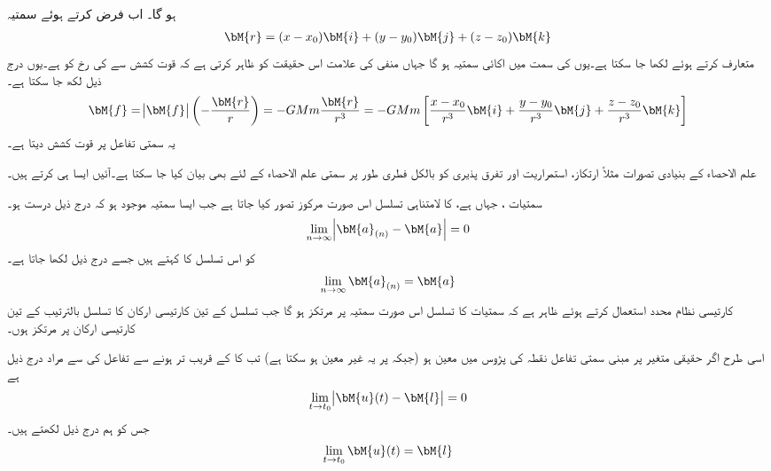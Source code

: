 ہو گا۔ اب  فرض کرتے ہوئے سمتیہ 
\begin{align}
\bM{r}=(x-x_0)\bM{i}+(y-y_0)\bM{j}+(z-z_0)\bM{k}
\end{align}
متعارف کرتے ہوئے  لکھا جا سکتا ہے۔یوں  کی سمت میں اکائی سمتیہ   ہو گا جہاں منفی کی علامت اس حقیقت کو ظاہر کرتی ہے کہ قوت کشش  سے  کی رخ کو  ہے۔یوں درج ذیل لکھ جا سکتا ہے۔
\begin{align}
\bM{f}=\abs{\bM{f}}\left(-\frac{\bM{r}}{r}\right)=-GMm\frac{\bM{r}}{r^3}=-GMm\left[\frac{x-x_0}{r^3}\bM{i}+\frac{y-y_0}{r^3}\bM{j}+\frac{z-z_0}{r^3}\bM{k}\right]
\end{align}
یہ سمتی تفاعل  پر قوت کشش دیتا ہے۔

علم الاحصاء کے بنیادی تصورات  مثلاً ارتکاز، استمراریت اور تفرق پذیری کو  بالکل فطری طور پر سمتی علم الاحصاء کے لئے بھی  بیان کیا جا سکتا ہے۔آئیں ایسا ہی کرتے ہیں۔

سمتیات ، جہاں  ہے، کا لامتناہی تسلسل اس صورت مرکوز تصور کیا جاتا ہے جب ایسا سمتیہ  موجود ہو کہ درج ذیل درست ہو۔
\begin{align}
\lim_{n\to \infty} \abs{\bM{a}_{(n)}-\bM{a}}=0
\end{align}  
 کو اس تسلسل کا  کہتے ہیں جسے درج ذیل لکھا جاتا ہے۔
\begin{align}
\lim_{n\to \infty} \bM{a}_{(n)}=\bM{a}
\end{align}
کارتیسی نظام محدد استعمال کرتے ہوئے ظاہر ہے کہ سمتیات کا تسلسل اس صورت سمتیہ  پر مرتکز ہو گا جب تسلسل کے تین کارتیسی ارکان کا تسلسل بالترتیب  کے تین کارتیسی ارکان پر مرتکز ہوں۔

اسی طرح اگر حقیقی متغیر  پر مبنی سمتی تفاعل  نقطہ  کی پڑوس میں معین ہو (جبکہ  پر یہ غیر معین ہو سکتا ہے) تب    کا  کے قریب تر ہونے سے تفاعل کی    سے مراد درج ذیل ہے
\begin{align}
\lim_{t\to t_0} \abs{\bM{u}(t)-\bM{l}}=0
\end{align}  
جس کو ہم درج ذیل لکھتے ہیں۔
\begin{align}
\lim_{t\to t_0} \bM{u}(t)=\bM{l}
\end{align}

